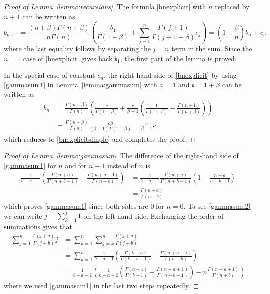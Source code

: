 \documentclass[12pt,a4paper]{article}
\numberwithin{equation}{section}
\begin{document}
\begin{proof}[Proof of Lemma~\ref{lemma:recursions}]
The formula \eqref{bnexplicit} with $n$ replaced by $n+1$ can be written as
\begin{equation}
b_{n+1}=\frac{(n+\beta)\Gamma(n+\beta)}{n\Gamma(n)}\left(\frac{b_1}{\Gamma(1+\beta)}+\sum_{j=1}^n\frac{\Gamma(j+1)}{\Gamma(j+1+\beta)}c_j\right)
=\left(1+\frac\beta n\right)b_n+c_n
\end{equation}
where the last equality follows by separating the $j=n$ term in the sum.
Since the $n=1$ case of \eqref{bnexplicit} gives back $b_1$, the first part of the lemma is proved.

In the special case of constant $c_n$, the right-hand side of \eqref{bnexplicit}
by using \eqref{gammasum1} in Lemma~\ref{lemma:gammasum} with $a=1$ and $b=1+\beta$ can be written as
\begin{equation}\begin{aligned}
b_n&=\frac{\Gamma(n+\beta)}{\Gamma(n)}
\left(\frac c{\Gamma(1+\beta)}+\frac c{\beta-1}\left(\frac1{\Gamma(1+\beta)}-\frac{\Gamma(n+1)}{\Gamma(n+\beta)}\right)\right)\\
&=\frac{\Gamma(n+\beta)}{\Gamma(n)}\frac{c\beta}{(\beta-1)\Gamma(1+\beta)}-\frac c{\beta-1}n
\end{aligned}\end{equation}
which reduces to \eqref{bnexplicitsimple} and completes the proof.
\end{proof}

\begin{proof}[Proof of Lemma~\ref{lemma:gammasum}]
The difference of the right-hand side of \eqref{gammasum1} for $n$ and for $n-1$ instead of $n$ is
\begin{equation}\begin{aligned}
\frac1{b-a-1}\left(\frac{\Gamma(n+a)}{\Gamma(n+b-1)}-\frac{\Gamma(n+a+1)}{\Gamma(n+b)}\right)
&=\frac1{b-a-1}\frac{\Gamma(n+a)}{\Gamma(n+b-1)}\left(1-\frac{n+a}{n+b-1}\right)\\
&=\frac{\Gamma(n+a)}{\Gamma(n+b)}
\end{aligned}\end{equation}
which proves \eqref{gammasum1} since both sides are $0$ for $n=0$.
To see \eqref{gammasum2} we can write $j=\sum_{k=1}^j1$ on the left-hand side.
Exchanging the order of summations gives that
\begin{equation}\begin{aligned}
\sum_{j=1}^n\frac{\Gamma(j+a)}{\Gamma(j+b)}j&=\sum_{k=1}^n\sum_{j=k}^n\frac{\Gamma(j+a)}{\Gamma(j+b)}\\
&=\sum_{k=1}^n\frac1{b-a-1}\left(\frac{\Gamma(k+a)}{\Gamma(k+b-1)}-\frac{\Gamma(n+a+1)}{\Gamma(n+b)}\right)\\
&=\frac1{b-a-1}\left(\frac1{b-a-2}\left(\frac{\Gamma(a+1)}{\Gamma(b-1)}-\frac{\Gamma(n+a+1)}{\Gamma(n+b-1)}\right)-n\frac{\Gamma(n+a+1)}{\Gamma(n+b)}\right)
\end{aligned}\end{equation}
where we used \eqref{gammasum1} in the last two steps repeatedly.
\end{proof}



\end{document}
